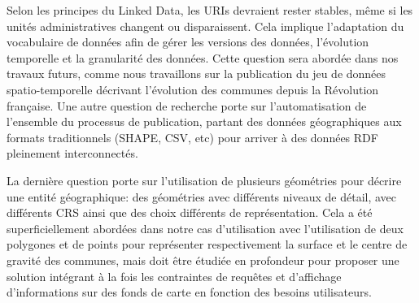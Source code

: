 Selon les principes du Linked Data, les URIs devraient rester stables, m\^{e}me si les unit\'{e}s administratives changent ou disparaissent. Cela implique l'adaptation du vocabulaire de donn\'{e}es afin de g\'{e}rer les versions des donn\'{e}es, l'\'{e}volution temporelle et la granularit\'{e} des donn\'{e}es. Cette question sera abord\'{e}e dans nos travaux futurs, comme nous travaillons sur la publication du jeu de donn\'{e}es spatio-temporelle d\'{e}crivant l'\'{e}volution des communes depuis la R\'{e}volution française. Une autre question de recherche porte sur l'automatisation de l'ensemble du processus de publication, partant des donn\'{e}es g\'{e}ographiques aux formats traditionnels (SHAPE, CSV, etc) pour arriver à des donn\'{e}es RDF pleinement interconnect\'{e}s.

La derni\`{e}re question porte sur l'utilisation de plusieurs g\'{e}om\'{e}tries pour d\'{e}crire une entit\'{e} g\'{e}ographique: des g\'{e}om\'{e}tries avec diff\'{e}rents niveaux de d\'{e}tail, avec diff\'{e}rents CRS ainsi que des choix diff\'{e}rents de repr\'{e}sentation. Cela a \'{e}t\'{e} superficiellement abord\'{e}es dans notre cas d'utilisation avec l'utilisation de deux polygones et de points pour repr\'{e}senter respectivement la surface et le centre de gravit\'{e} des communes, mais doit \^{e}tre \'{e}tudi\'{e}e en profondeur pour proposer une solution int\'{e}grant à la fois les contraintes de requ\^{e}tes et d'affichage d'informations sur des fonds de carte en fonction des besoins utilisateurs.

